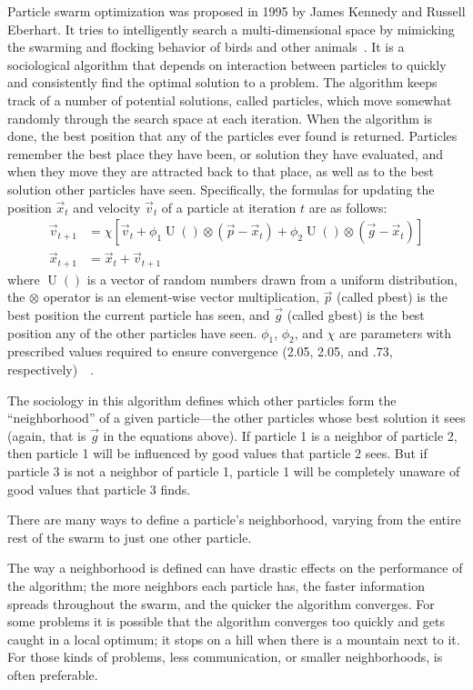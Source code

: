 \documentclass[onecolumn, 12pt]{article}
\DeclareMathOperator{\URand}{U}
\providecommand{\ppos}{\ensuremath{\Vec{x}}}
\providecommand{\pvel}{\ensuremath{\Vec{v}}}
\providecommand{\gbest}{\ensuremath{\Vec{g}}}
\providecommand{\pbest}{\ensuremath{\Vec{p}}}
\providecommand{\constriction}{\ensuremath{\chi}}
\providecommand{\coeff}{\ensuremath{\phi}}
\begin{document}
Particle swarm optimization was proposed in 1995 by James Kennedy and Russell
Eberhart.  It tries to intelligently search a multi-dimensional space by
mimicking the swarming and flocking behavior of birds and other
animals~\cite{kennedy-icnn95}. It is a sociological algorithm that depends on
interaction between particles to quickly and consistently find the optimal
solution to a problem.  The algorithm keeps track of a number of potential
solutions, called particles, which move somewhat randomly through the search
space at each iteration.  When the algorithm is done, the best position that
any of the particles ever found is returned.  Particles remember the best place
they have been, or solution they have evaluated, and when they move they are
attracted back to that place, as well as to the best solution other particles
have seen.  Specifically, the formulas for updating the position $\ppos_t$ and
velocity $\pvel_t$ of a particle at iteration $t$ are as follows:
\begin{align}
\label{eq:velupdate}
	\pvel_{t+1} &=
		\constriction \left[ \pvel_t +
			\coeff_1\URand()\otimes(\pbest - \ppos_t) +
			\coeff_2\URand()\otimes(\gbest - \ppos_t)
		\right] \\
\label{eq:posupdate}
	\ppos_{t+1} &= \ppos_t + \pvel_{t+1}
\end{align}
where \( \URand() \) is a vector of random numbers drawn from a uniform
distribution, the \( \otimes \) operator is an element-wise vector
multiplication, $\pbest$ (called pbest) is the best position the current
particle has seen, and $\gbest$ (called gbest) is the best position any of the
other particles have seen.  \( \coeff_1 \), \( \coeff_2 \), and \(
\constriction \) are parameters with prescribed values required to ensure
convergence (2.05, 2.05, and .73,
respectively)~\cite{clerc-tec02}~\cite{poli-aea08}.

The sociology in this algorithm defines which other particles form the
``neighborhood'' of a given particle---the other particles whose best solution
it sees (again, that is $\gbest$ in the equations above).  If particle 1 is a
neighbor of particle 2, then particle 1 will be influenced by good values that
particle 2 sees.  But if particle 3 is not a neighbor of particle 1, particle 1
will be completely unaware of good values that particle 3 finds.  

There are many ways to define a particle's neighborhood, varying from the
entire rest of the swarm to just one other particle.  

The way a neighborhood is defined can have drastic effects on the performance
of the algorithm; the more neighbors each particle has, the faster information
spreads throughout the swarm, and the quicker the algorithm converges.  For
some problems it is possible that the algorithm converges too quickly and gets
caught in a local optimum; it stops on a hill when there is a mountain next to
it.  For those kinds of problems, less communication, or smaller neighborhoods,
is often preferable.
\end{document}

